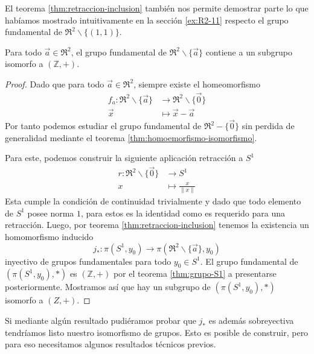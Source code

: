El teorema \ref{thm:retraccion-inclusion} también nos permite demostrar
parte lo que habíamos mostrado intuitivamente en la sección
\ref{ex:R2-11} respecto el grupo fundamental de \(\Re ^2 \backslash
\{(1,1)\}\).
\begin{corolario} \label{cor:retraccion-R2-S1-inyectivo}
  Para todo \(\vec a \in \Re ^2\), el grupo fundamental de \(\Re ^2
\backslash \{\vec a\}\) contiene a un subgrupo isomorfo a \((\mathbb Z, +)\).
\end{corolario}
\begin{proof}
Dado que para todo \(\vec a \in \Re ^2 \), siempre existe
el homeomorfismo
\begin{align*}
   f_a : \Re^2 \backslash \{\vec a\} &\longrightarrow \Re ^2 \backslash
      \{\vec 0\} \\
   \vec x &\longmapsto \vec x - \vec a
\end{align*}
Por tanto podemos estudiar el grupo fundamental de \(\Re ^2 - \{\vec
0\}\) sin perdida de generalidad mediante el teorema
\ref{thm:homoemorfismo-isomorfismo}.

Para este, podemos construir la siguiente aplicación retracción a
\(S^1\)
\begin{align*}
   r : \Re ^2 \backslash \{\vec 0\} &\longrightarrow S^1 \\
   x &\longmapsto \frac x {\lVert x \rVert}
\end{align*}
Esta cumple la condición de continuidad trivialmente y dado que todo
elemento de \(S^1\) posee norma \(1\), para estos es la identidad
como es requerido para una retracción. Luego, por teorema
\ref{thm:retraccion-inclusion} tenemos la existencia un homomorfismo
inducido
\[ j_* : \pi (S^1 , y_0) \to \pi (\Re ^2 \backslash \{\vec a\}, y_0) \]
inyectivo de grupos fundamentales para todo \(y_0 \in S^1 \). El
grupo fundamental de \(\left( \pi (S^1, y_0) , * \right) \) es \( (\mathbb Z, +)\)
por el teorema \ref{thm:grupo-S1} a presentarse posteriormente.
Mostramos así que hay un subgrupo de \(\left( \pi (S^1, y_0), * \right)
\) isomorfo a \((Z,+)\).
\end{proof}

Si mediante algún resultado pudiéramos probar que \(j_{*}\) es además
sobreyectiva tendríamos listo nuestro isomorfismo de grupos. Esto es
posible de construir, pero para eso necesitamos algunos resultados
técnicos previos.

